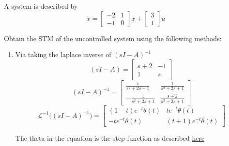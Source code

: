 \item A system is described by
  \begin{equation}
\dot x = \begin{bmatrix}
-2 & 1\\
-1 & 0
\end{bmatrix}
x + \begin{bmatrix}
3\\
1
\end{bmatrix}
u\end{equation}

  Obtain the STM of the uncontrolled system using the following methods:
  \begin{enumerate}
  \item Via taking the laplace inverse of $(sI - A)^{-1}$ \\
    \begin{equation}
(sI-A) = \left[\begin{matrix}s + 2 & -1\\1 & s\end{matrix}\right]\end{equation}
\begin{equation}
(sI-A)^{-1} = \left[\begin{matrix}\frac{s}{s^{2} + 2 s + 1} & \frac{1}{s^{2} + 2 s + 1}\\- \frac{1}{s^{2} + 2 s + 1} & \frac{s + 2}{s^{2} + 2 s + 1}\end{matrix}\right]\end{equation}
\begin{equation}
\mathscr{L}^{-1}\Big ((sI-A)^{-1}\Big ) = \left[\begin{matrix}\left(1 - t\right) e^{- t} \theta\left(t\right) & t e^{- t} \theta\left(t\right)\\- t e^{- t} \theta\left(t\right) & \left(t + 1\right) e^{- t} \theta\left(t\right)\end{matrix}\right]\end{equation}

    
    The theta in the equation is the step function as described
    \href{https://math.stackexchange.com/questions/1967109/inverse-laplace-transfrom-using-sympy}{here}
    

\end{enumerate}
